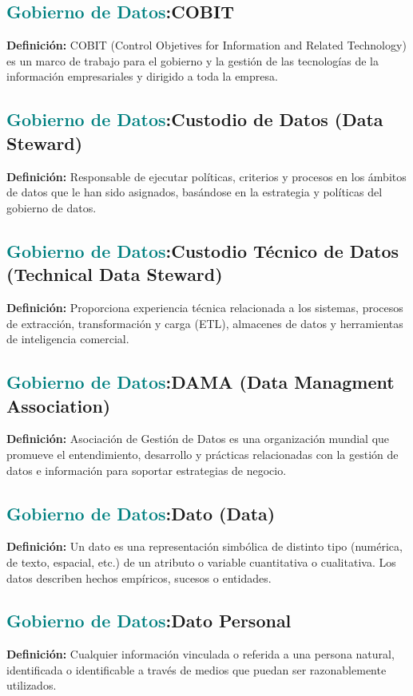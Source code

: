 \documentclass[12pt]{article}
\begin{document}
\subsection{\textcolor{teal}{Gobierno de Datos}:{COBIT}}
\textbf{Definición:} COBIT (Control Objetives for Information and Related Technology) es un marco de trabajo para el gobierno y la gestión de las tecnologías de la información empresariales y dirigido a toda la empresa.
\subsection{\textcolor{teal}{Gobierno de Datos}:{Custodio de Datos (Data Steward)}}
\textbf{Definición:} Responsable de ejecutar políticas, criterios y procesos en los ámbitos de datos que le han sido asignados, basándose en la estrategia y políticas del gobierno de datos.
\subsection{\textcolor{teal}{Gobierno de Datos}:{Custodio Técnico de Datos (Technical Data Steward)}}
\textbf{Definición:} Proporciona experiencia técnica relacionada a los sistemas, procesos de extracción, transformación y carga (ETL), almacenes de datos y herramientas de inteligencia comercial.
\subsection{\textcolor{teal}{Gobierno de Datos}:{DAMA (Data Managment Association)}}
\textbf{Definición:} Asociación de Gestión de Datos es una organización mundial que promueve el entendimiento, desarrollo y prácticas relacionadas con la gestión de datos e información para soportar estrategias de negocio.

\subsection{\textcolor{teal}{Gobierno de Datos}:{Dato (Data)}}
\textbf{Definición:} Un dato es una representación simbólica de distinto tipo (numérica, de texto, espacial, etc.) de un atributo o variable cuantitativa o cualitativa. Los datos describen hechos empíricos, sucesos o entidades.
\subsection{\textcolor{teal}{Gobierno de Datos}:{Dato Personal}}
\textbf{Definición:} Cualquier información vinculada o referida a una persona natural, identificada o identificable a través de medios que puedan ser razonablemente utilizados.
\end{document}
